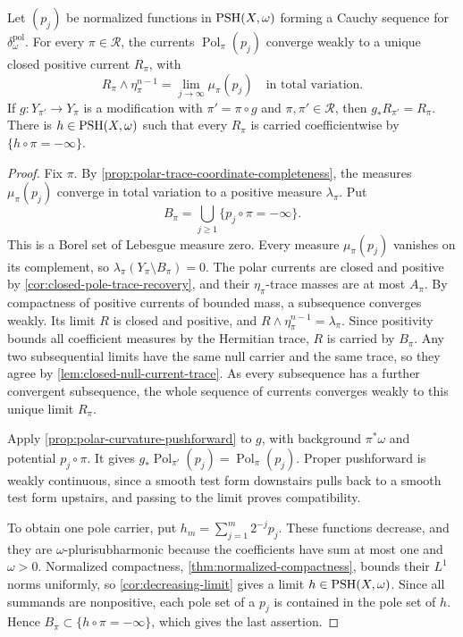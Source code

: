 \begin{proposition}\label{prop:closed-pole-compatible-limits}
Let $(p_j)$ be normalized functions in $\mathrm{PSH}(X,\omega)$ forming a Cauchy sequence for $\delta_\omega^{\mathrm{pol}}$. For every $\pi\in\mathscr R$, the currents $\operatorname{Pol}_\pi(p_j)$ converge weakly to a unique closed positive current $R_\pi$, with
\[
 R_\pi\wedge\eta_\pi^{n-1}
       =\lim_{j\to\infty}\mu_\pi(p_j)
       \quad\text{in total variation}.
\]
If $g\colon Y_{\pi'}\to Y_\pi$ is a modification with $\pi'=\pi\circ g$ and $\pi,\pi'\in\mathscr R$, then $g_*R_{\pi'}=R_\pi$. There is $h\in\mathrm{PSH}(X,\omega)$ such that every $R_\pi$ is carried coefficientwise by $\{h\circ\pi=-\infty\}$.
\end{proposition}
\begin{proof}
Fix $\pi$. By \cref{prop:polar-trace-coordinate-completeness}, the measures $\mu_\pi(p_j)$ converge in total variation to a positive measure $\lambda_\pi$. Put
\[
 B_\pi=\bigcup_{j\geq1}\{p_j\circ\pi=-\infty\}.
\]
This is a Borel set of Lebesgue measure zero. Every measure $\mu_\pi(p_j)$ vanishes on its complement, so $\lambda_\pi(Y_\pi\setminus B_\pi)=0$. The polar currents are closed and positive by \cref{cor:closed-pole-trace-recovery}, and their $\eta_\pi$-trace masses are at most $A_\pi$. By compactness of positive currents of bounded mass, a subsequence converges weakly. Its limit $R$ is closed and positive, and $R\wedge\eta_\pi^{n-1}=\lambda_\pi$. Since positivity bounds all coefficient measures by the Hermitian trace, $R$ is carried by $B_\pi$. Any two subsequential limits have the same null carrier and the same trace, so they agree by \cref{lem:closed-null-current-trace}. As every subsequence has a further convergent subsequence, the whole sequence of currents converges weakly to this unique limit $R_\pi$.

Apply \cref{prop:polar-curvature-pushforward} to $g$, with background $\pi^*\omega$ and potential $p_j\circ\pi$. It gives $g_*\operatorname{Pol}_{\pi'}(p_j)=\operatorname{Pol}_\pi(p_j)$. Proper pushforward is weakly continuous, since a smooth test form downstairs pulls back to a smooth test form upstairs, and passing to the limit proves compatibility.

To obtain one pole carrier, put $h_m=\sum_{j=1}^m2^{-j}p_j$. These functions decrease, and they are $\omega$-plurisubharmonic because the coefficients have sum at most one and $\omega>0$. Normalized compactness, \cref{thm:normalized-compactness}, bounds their $L^1$ norms uniformly, so \cref{cor:decreasing-limit} gives a limit $h\in\mathrm{PSH}(X,\omega)$. Since all summands are nonpositive, each pole set of a $p_j$ is contained in the pole set of $h$. Hence $B_\pi\subset\{h\circ\pi=-\infty\}$, which gives the last assertion.
\end{proof}

